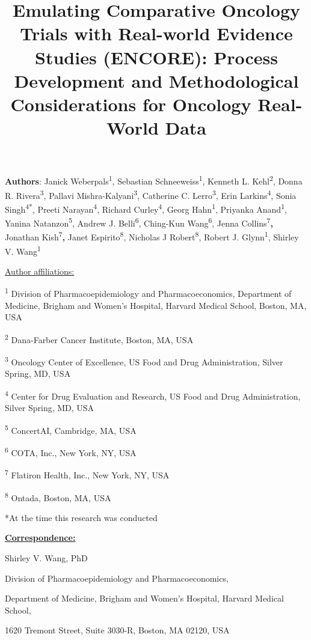 \documentclass[
  letterpaper,
  DIV=11,
  numbers=noendperiod]{scrartcl}
\title{Emulating Comparative Oncology Trials with Real-world Evidence
Studies (ENCORE): Process Development and Methodological Considerations
for Oncology Real-World Data}
\author{}
\date{}
\begin{document}
\maketitle


\textbf{Authors}: Janick Weberpals\textsuperscript{1}, Sebastian
Schneeweiss\textsuperscript{1}, Kenneth L. Kehl\textsuperscript{2},
Donna R. Rivera\textsuperscript{3}, Pallavi
Mishra-Kalyani\textsuperscript{3}, Catherine C.
Lerro\textsuperscript{3}, Erin Larkins\textsuperscript{4}, Sonia
Singh\textsuperscript{4*}, Preeti Narayan\textsuperscript{4}, Richard
Curley\textsuperscript{4}, Georg Hahn\textsuperscript{1}, Priyanka
Anand\textsuperscript{1}, Yanina Natanzon\textsuperscript{5}, Andrew J.
Belli\textsuperscript{6}, Ching-Kun Wang\textsuperscript{6}, Jenna
Collins\textsuperscript{7}\textbf{,} Jonathan
Kish\textsuperscript{7}\textbf{,} Janet Espirito\textsuperscript{8},
Nicholas J Robert\textsuperscript{8}, Robert J.
Glynn\textsuperscript{1}, Shirley V. Wang\textsuperscript{1}

\ul{Author affiliations:}

\textsuperscript{1} Division of Pharmacoepidemiology and
Pharmacoeconomics, Department of Medicine, Brigham and Women's Hospital,
Harvard Medical School, Boston, MA, USA

\textsuperscript{2} Dana-Farber Cancer Institute, Boston, MA, USA

\textsuperscript{3} Oncology Center of Excellence, US Food and Drug
Administration, Silver Spring, MD, USA

\textsuperscript{4} Center for Drug Evaluation and Research, US Food and
Drug Administration, Silver Spring, MD, USA

\textsuperscript{5} ConcertAI, Cambridge, MA, USA

\textsuperscript{6} COTA, Inc., New York, NY, USA

\textsuperscript{7} Flatiron Health, Inc., New York, NY, USA

\textsuperscript{8} Ontada, Boston, MA, USA

*At the time this research was conducted

\ul{\textbf{Correspondence:}}

Shirley V. Wang, PhD

Division of Pharmacoepidemiology and Pharmacoeconomics,

Department of Medicine, Brigham and Women's Hospital, Harvard Medical
School,

1620 Tremont Street, Suite 3030-R, Boston, MA 02120, USA
\end{document}
